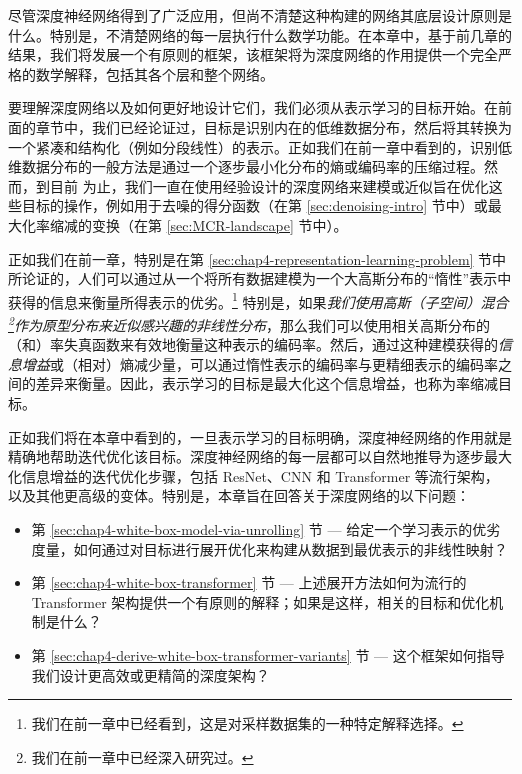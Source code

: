 \documentclass[../../book-main.tex]{subfiles}
\begin{document}
尽管深度神经网络得到了广泛应用，但尚不清楚这种构建的网络其底层设计原则是什么。特别是，不清楚网络的每一层执行什么数学功能。在本章中，基于前几章的结果，我们将发展一个有原则的框架，该框架将为深度网络的作用提供一个完全严格的数学解释，包括其各个层和整个网络。

要理解深度网络以及如何更好地设计它们，我们必须从表示学习的目标开始。在前面的章节中，我们已经论证过，目标是识别内在的低维数据分布，然后将其转换为一个紧凑和结构化（例如分段线性）的表示。正如我们在前一章中看到的，识别低维数据分布的一般方法是通过一个逐步最小化分布的熵或编码率的压缩过程。然而，到目前
为止，我们一直在使用经验设计的深度网络来建模或近似旨在优化这些目标的操作，例如用于去噪的得分函数（在第 \ref{sec:denoising-intro} 节中）或最大化率缩减的变换（在第 \ref{sec:MCR-landscape} 节中）。

正如我们在前一章，特别是在第 \ref{sec:chap4-representation-learning-problem} 节中所论证的，人们可以通过从一个将所有数据建模为一个大高斯分布的“惰性”表示中获得的信息来衡量所得表示的优劣。\footnote{我们在前一章中已经看到，这是对采样数据集的一种特定解释选择。} 特别是，如果\textit{我们使用高斯（子空间）混合\footnote{我们在前一章中已经深入研究过。}作为原型分布来近似感兴趣的非线性分布}，那么我们可以使用相关高斯分布的（和）率失真函数来有效地衡量这种表示的编码率。然后，通过这种建模获得的{\em 信息增益}或（相对）熵减少量，可以通过惰性表示的编码率与更精细表示的编码率之间的差异来衡量。因此，表示学习的目标是最大化这个信息增益，也称为率缩减目标。

正如我们将在本章中看到的，一旦表示学习的目标明确，深度神经网络的作用就是精确地帮助迭代优化该目标。深度神经网络的每一层都可以自然地推导为逐步最大化信息增益的迭代优化步骤，包括 ResNet、CNN 和 Transformer 等流行架构，以及其他更高级的变体。特别是，本章旨在回答关于深度网络的以下问题：
\begin{itemize}
    \item 第 \ref{sec:chap4-white-box-model-via-unrolling} 节 --- 给定一个学习表示的优劣度量，如何通过对目标进行展开优化来构建从数据到最优表示的非线性映射？
    \item 第 \ref{sec:chap4-white-box-transformer} 节 --- 上述展开方法如何为流行的 Transformer 架构提供一个有原则的解释；如果是这样，相关的目标和优化机制是什么？
    \item 第 \ref{sec:chap4-derive-white-box-transformer-variants} 节 --- 这个框架如何指导我们设计更高效或更精简的深度架构？
\end{itemize}
\end{document}
